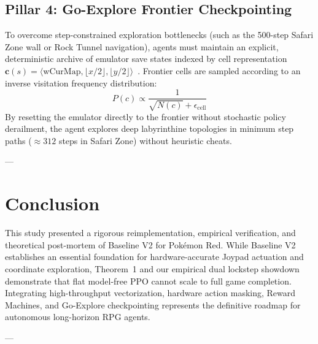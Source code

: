 \documentclass[conference]{IEEEtran}
\begin{document}
\subsection{Pillar 4: Go-Explore Frontier Checkpointing}
To overcome step-constrained exploration bottlenecks (such as the 500-step Safari Zone wall or Rock Tunnel navigation), agents must maintain an explicit, deterministic archive of emulator save states indexed by cell representation $\mathbf{c}(s) = \langle \text{wCurMap}, \lfloor x/2 \rfloor, \lfloor y/2 \rfloor \rangle$~\cite{ecoffet2021first}. Frontier cells are sampled according to an inverse visitation frequency distribution:
\begin{equation}
P(c) \propto \frac{1}{\sqrt{N(c)} + \epsilon_{\text{cell}}}
\end{equation}
By resetting the emulator directly to the frontier without stochastic policy derailment, the agent explores deep labyrinthine topologies in minimum step paths ($\approx 312$ steps in Safari Zone) without heuristic cheats.

---

\section{Conclusion}
This study presented a rigorous reimplementation, empirical verification, and theoretical post-mortem of Baseline V2 for Pok{\'e}mon Red. While Baseline V2 establishes an essential foundation for hardware-accurate Joypad actuation and coordinate exploration, Theorem~1 and our empirical dual lockstep showdown demonstrate that flat model-free PPO cannot scale to full game completion. Integrating high-throughput vectorization, hardware action masking, Reward Machines, and Go-Explore checkpointing represents the definitive roadmap for autonomous long-horizon RPG agents.

---



\end{document}
